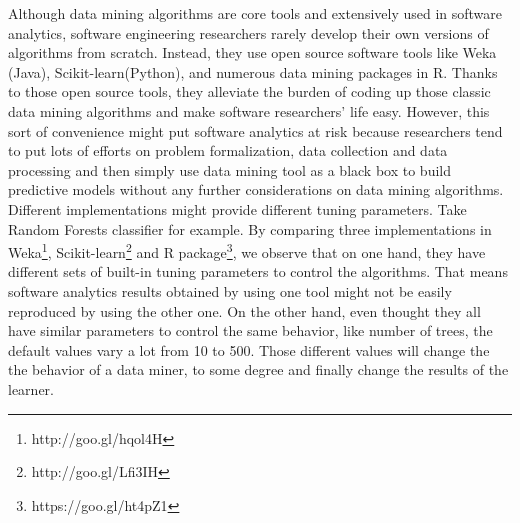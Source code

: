 Although data mining algorithms are core tools and extensively used in software analytics, software engineering 
researchers rarely develop their own versions of algorithms from scratch. Instead, they use
open source software tools like Weka (Java)\cite{hall2009weka}, 
Scikit-learn(Python)\cite{scikit-learn}, and numerous data mining packages in R. Thanks to those open 
source tools, they alleviate the burden of coding up those classic data mining algorithms and make
software researchers' life easy. However, this sort of convenience might put 
software analytics at risk because researchers tend to put lots of efforts on problem formalization, 
data collection and data processing and then simply use data mining tool as a black box to build 
predictive models without any further considerations on data mining algorithms\cite{sun2010discriminative,jalbert2008automated, antoniol2008bug,zanetti2013categorizing,lamkanfi2011comparing,tian2013drone, alipour2013contextual,lin2009empirical,hall11,me07b,choetkiertikul2015predicting,anvik2006should, bhattacharya2010fine}.
Different implementations might
provide different tuning parameters. Take Random Forests classifier for example.
By comparing three implementations in Weka\footnote {http://goo.gl/hqol4H}, 
Scikit-learn\footnote{http://goo.gl/Lfi3IH} and R package\footnote{https://goo.gl/ht4pZ1}, 
we observe that on one hand, they have different sets of built-in tuning parameters
to control the algorithms. That means software analytics results obtained by
using one tool might not be easily reproduced by using the other one.
On the other hand, even thought they all have similar parameters to control
the same behavior, like number of trees, the default values vary a lot from 10 to 500. 
Those different values will change the the behavior of a data miner, 
to some degree and finally change the results of the learner.




